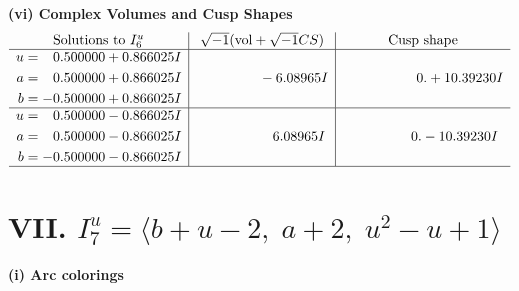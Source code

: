 \documentclass[1p]{elsarticle_modified}
\theoremstyle{definition}
\newcommand{\I}{\sqrt{-1}}
\begin{document}
\newpage\flushleft \textbf{(vi) Complex Volumes and Cusp Shapes}
$$\begin{array}{c|c|c}  
\text{Solutions to }I^u_{6}& \I (\text{vol} + \sqrt{-1}CS) & \text{Cusp shape}\\
 \hline 
\begin{aligned}
u &= \phantom{-}0.500000 + 0.866025 I \\
a &= \phantom{-}0.500000 + 0.866025 I \\
b &= -0.500000 + 0.866025 I\end{aligned}
 & \phantom{-0.000000 } -6.08965 I & \phantom{-0.000000 -}0. + 10.39230 I \\ \hline\begin{aligned}
u &= \phantom{-}0.500000 - 0.866025 I \\
a &= \phantom{-}0.500000 - 0.866025 I \\
b &= -0.500000 - 0.866025 I\end{aligned}
 & \phantom{-0.000000 -}6.08965 I & \phantom{-0.000000 } 0. - 10.39230 I\\
 \hline 
 \end{array}$$\newpage\newpage\renewcommand{\arraystretch}{1}
\centering \section*{VII. $I^u_{7}= \langle b+u-2,\;a+2,\;u^2- u+1 \rangle$}
\flushleft \textbf{(i) Arc colorings}\\
\end{document}
